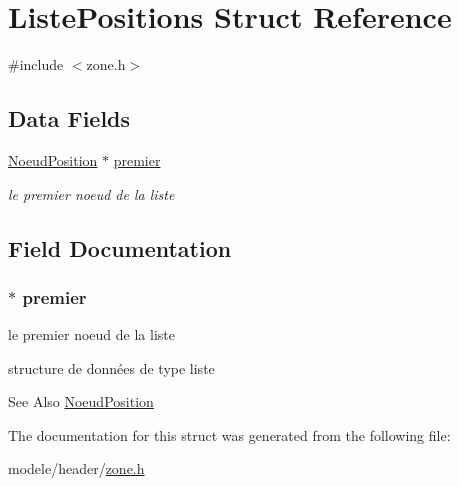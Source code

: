\hypertarget{struct_liste_positions}{\section{Liste\-Positions Struct Reference}
\label{struct_liste_positions}
}


{\ttfamily \#include $<$zone.\-h$>$}

\subsection*{Data Fields}
\begin{DoxyCompactItemize}
\item 
\hyperlink{struct_noeud_position}{Noeud\-Position} $\ast$ \hyperlink{struct_liste_positions_adb7b987a178be8ba27b0880c6eb3f0a9}{premier}
\begin{DoxyCompactList}\small\item\em le premier noeud de la liste \end{DoxyCompactList}\end{DoxyCompactItemize}


\subsection{Field Documentation}
\hypertarget{struct_liste_positions_adb7b987a178be8ba27b0880c6eb3f0a9}{
\subsubsection[{premier}]{$\ast$ premier}}\label{struct_liste_positions_adb7b987a178be8ba27b0880c6eb3f0a9}


le premier noeud de la liste 

structure de données de type liste \begin{DoxySeeAlso}{See Also}
\hyperlink{struct_noeud_position}{Noeud\-Position} 
\end{DoxySeeAlso}


The documentation for this struct was generated from the following file\-:\begin{DoxyCompactItemize}
\item 
modele/header/\hyperlink{zone_8h}{zone.\-h}\end{DoxyCompactItemize}
